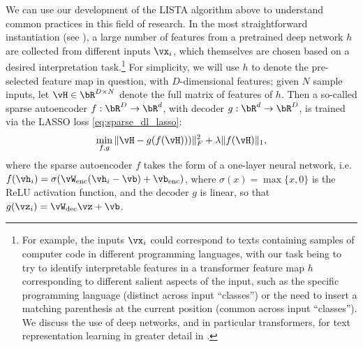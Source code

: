 \documentclass[../../book-main.tex]{subfiles}
\begin{document}
We can use our development of the LISTA algorithm above to understand common
practices in this field of research.
In the most straightforward instantiation (see \citep{huben2024sparse,
gao2025scaling}), a large number of features from a pretrained deep network $h$
are collected from different inputs $\vx_i$, which themselves are chosen based
on a desired interpretation task.\footnote{For example, the inputs $\vx_i$ could
correspond to texts containing samples of computer code in different programming
languages, with our task being to try to identify interpretable features in
a transformer feature map $h$ corresponding to different salient aspects of the
input, such as the specific programming language (distinct across input
``classes'') or the need to insert a matching parenthesis at the current
position (common across input ``classes''). We discuss the use of deep networks,
and in particular transformers, for text representation
learning in greater detail in .} For
simplicity, we will use $h$ to denote the pre-selected feature map in question,
with $D$-dimensional features; given $N$ sample inputs, let $\vH \in \bR^{D
\times N}$ denote the full matrix of features of $h$.
Then a so-called sparse autoencoder $f : \bR^D \to \bR^d$, with decoder $g : \bR^d \to
\bR^D$, is trained via the LASSO loss \eqref{eq:sparse_dl_lasso}:
\begin{equation}\label{eq:sae-loss}
  \min_{f, g} \| \vH - g(f(\vH))) \|_F^2 + \lambda \|f(\vH)\|_1 ,
\end{equation}
where the sparse autoencoder $f$ takes the form of a one-layer neural
network, i.e.\ $f(\vh_i) = \sigma(\vW_{\mathrm{enc}}(\vh_i - \vb)
+ \vb_{\mathrm{enc}})$, where $\sigma(x) = \max \{x, 0\}$ is the ReLU activation
function, and the decoder $g$ is linear, so that $g(\vz_i)
= \vW_{\mathrm{dec}}\vz + \vb$.
\end{document}
